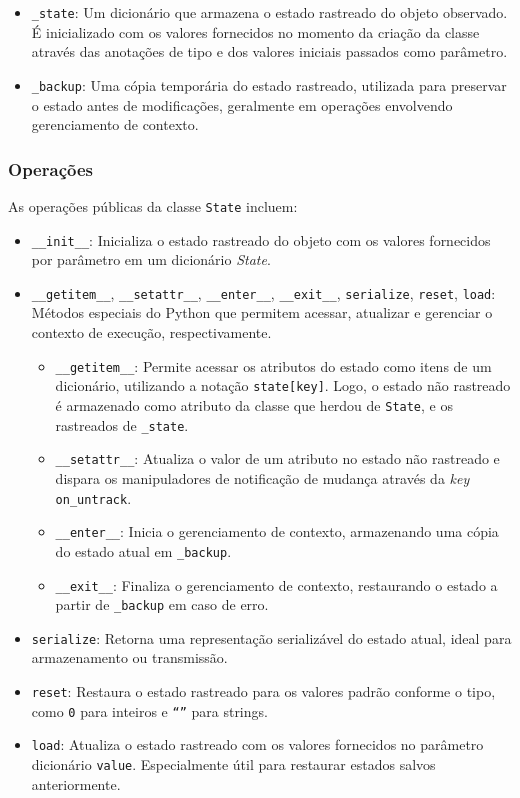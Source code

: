 \begin{itemize}
    \item \texttt{\_state}: Um dicionário que armazena o estado rastreado do objeto observado. É inicializado com os valores fornecidos no momento da criação da classe através das anotações de tipo e dos valores iniciais passados como parâmetro.
    \item \texttt{\_backup}: Uma cópia temporária do estado rastreado, utilizada para preservar o estado antes de modificações, geralmente em operações envolvendo gerenciamento de contexto.
\end{itemize}

\subsubsection{Operações}

As operações públicas da classe \texttt{State} incluem:

\begin{itemize}
    \item \texttt{\_\_init\_\_}: Inicializa o estado rastreado do objeto com os valores fornecidos por parâmetro em um dicionário \textit{State}.
    \item \texttt{\_\_getitem\_\_}, \texttt{\_\_setattr\_\_}, \texttt{\_\_enter\_\_}, \texttt{\_\_exit\_\_}, \texttt{serialize}, \texttt{reset}, \texttt{load}: Métodos especiais do Python que permitem acessar, atualizar e gerenciar o contexto de execução, respectivamente.
    \begin{itemize}
        \item \texttt{\_\_getitem\_\_}: Permite acessar os atributos do estado como itens de um dicionário, utilizando a notação \texttt{state[key]}. Logo, o estado não rastreado é armazenado como atributo da classe que herdou de \texttt{State}, e os rastreados de \texttt{\_state}.
        \item \texttt{\_\_setattr\_\_}: Atualiza o valor de um atributo no estado não rastreado e dispara os manipuladores de notificação de mudança através da \textit{key} \texttt{on\_untrack}.
        \item \texttt{\_\_enter\_\_}: Inicia o gerenciamento de contexto, armazenando uma cópia do estado atual em \texttt{\_backup}.
        \item \texttt{\_\_exit\_\_}: Finaliza o gerenciamento de contexto, restaurando o estado a partir de \texttt{\_backup} em caso de erro.
    \end{itemize}
    \item \texttt{serialize}: Retorna uma representação serializável do estado atual, ideal para armazenamento ou transmissão.
    \item \texttt{reset}: Restaura o estado rastreado para os valores padrão conforme o tipo, como \texttt{0} para inteiros e \texttt{``''} para strings.
    \item \texttt{load}: Atualiza o estado rastreado com os valores fornecidos no parâmetro dicionário \texttt{value}. Especialmente útil para restaurar estados salvos anteriormente.
\end{itemize}

